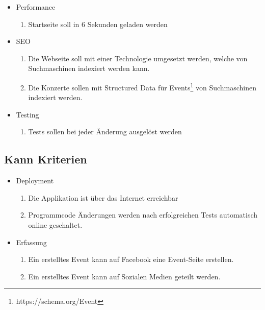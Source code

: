 \begin{itemize}
\tightlist
\item
  Performance
  \begin{enumerate}
  \def\labelenumi{\arabic{enumi}.}
  \tightlist
  \item
    Startseite soll in 6 Sekunden geladen werden
  \end{enumerate}
\end{itemize}

\begin{itemize}
\tightlist
\item
  SEO
  \begin{enumerate}
  \def\labelenumi{\arabic{enumi}.}
  \tightlist
  \item
    Die Webseite soll mit einer Technologie umgesetzt werden, welche von
    Suchmaschinen indexiert werden kann.
  \item
    Die Konzerte sollen mit Structured Data für Events\footnote{https://schema.org/Event}
    von Suchmaschinen indexiert werden.
  \end{enumerate}
\end{itemize}

\begin{itemize}
\tightlist
\item
  Testing
  \begin{enumerate}
  \def\labelenumi{\arabic{enumi}.}
  \tightlist
  \item
    Tests sollen bei jeder Änderung ausgelöst werden
  \end{enumerate}
\end{itemize}

\subsection{Kann Kriterien}\label{kann-kriterien}

\begin{itemize}
\tightlist
\item
  Deployment
  \begin{enumerate}
  \def\labelenumi{\arabic{enumi}.}
  \tightlist
  \item
    Die Applikation ist über das Internet erreichbar
  \item
    Programmcode Änderungen werden nach erfolgreichen Tests automatisch
    online geschaltet.
  \end{enumerate}
\end{itemize}

\begin{itemize}
\tightlist
\item
  Erfassung
  \begin{enumerate}
  \def\labelenumi{\arabic{enumi}.}
  \tightlist
  \item
    Ein erstelltes Event kann auf Facebook eine Event-Seite erstellen.
  \item
    Ein erstelltes Event kann auf Sozialen Medien geteilt werden.
  \end{enumerate}
\end{itemize}

